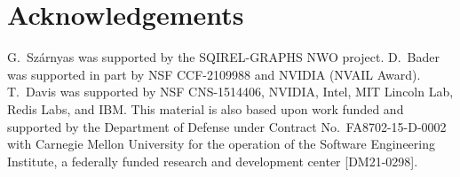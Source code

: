 \section*{Acknowledgements}

G.~Sz\'arnyas was supported by the SQIREL-GRAPHS NWO project.
D.~Bader was supported in part by NSF CCF-2109988 and NVIDIA (NVAIL Award).
T.~Davis was supported by NSF CNS-1514406, NVIDIA, Intel, MIT Lincoln Lab,
Redis Labs, and IBM.
This material is also based upon work funded and supported by the Department of
Defense under Contract No.~FA8702-15-D-0002 with Carnegie Mellon University for
the operation of the Software Engineering Institute, a federally funded research
and development center [DM21-0298].


